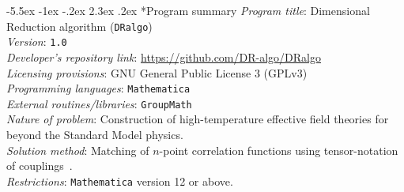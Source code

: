 \documentclass[11pt]{article}
\makeatletter
\def\dralgo{{\tt DRalgo}}
\newcommand{\DRalgoVersion}{{\tt 1.0}}
\renewcommand\section{\@startsection{section}{1}{\z@}%
  {-5.5ex \@plus -1ex \@minus -.2ex}%
  {2.3ex \@plus.2ex}%
  {\normalfont\large\bfseries}}
\makeatother
\begin{document}
\renewcommand{\thefootnote}{\arabic{footnote}}
\setcounter{footnote}{0}

%

\clearpage
%
\section*{Program summary}
{\em Program title}:
Dimensional Reduction algorithm (\dralgo{})
\\%
{\em Version}:
{\tt \DRalgoVersion{}}
\\%
{\em Developer's repository link}:
\url{https://github.com/DR-algo/DRalgo}
\\%
{\em Licensing provisions}:
GNU General Public License 3 (GPLv3)
\\%
{\em Programming languages}:
{\tt Mathematica}
\\%
{\em External routines/libraries}:
{\tt GroupMath}~\cite{Fonseca:2020vkee}
\\%
{\em Nature of problem}:
Construction of
high-temperature effective field theories for
beyond the Standard Model physics.
\\%
{\em Solution method}:
Matching of $n$-point correlation functions using
tensor-notation of couplings~\cite{%
	Martin:2017lqne,Martin:2018emoe,Machacek:1984zwe,Machacek:1983fie,Machacek:1983tze}.
\\%
{\em Restrictions}:
{\tt Mathematica} version 12 or above.
\end{document}
